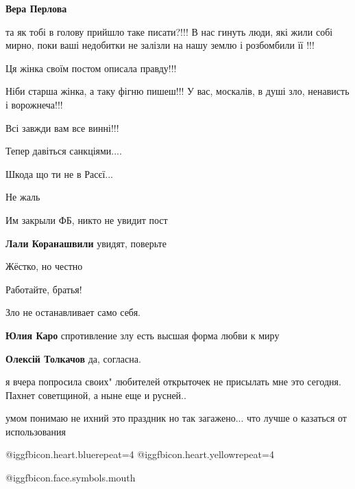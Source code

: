 \begin{itemize}
\begin{itemize}
\textbf{Вера Перлова} 

та як тобі в голову прийшло таке писати?!!! В нас гинуть люди, які жили собі
мирно, поки ваші недобитки не залізли на нашу землю і розбомбили її !!!

Ця жінка своїм постом описала правду!!!

Ніби старша жінка, а таку фігню пишеш!!! У вас, москалів, в душі зло, ненависть
і ворожнеча!!!

Всі завжди вам все винні!!!

Тепер давіться санкціями....

Шкода що ти не в Расєї...

\end{itemize} %

Не жаль

Им закрыли ФБ, никто не увидит пост

\textbf{Лали Коранашвили} увидят, поверьте

Жёстко, но честно

Работайте, братья!

Зло не останавливает само себя.

\begin{itemize} %
\textbf{Юлия Каро} спротивление злу есть высшая форма любви к миру

\textbf{Олексій Толкачов} да, согласна.
\end{itemize} %


я вчера попросила своих" любителей открыточек не присылать мне это сегодня.
Пахнет советщиной, а ныне еще и русней..

умом понимаю не ихний это праздник но так загажено... что лучше о казаться от
использования

@igg{fbicon.heart.blue}{repeat=4}  @igg{fbicon.heart.yellow}{repeat=4} 

 @igg{fbicon.face.symbols.mouth} 

\end{itemize} %
